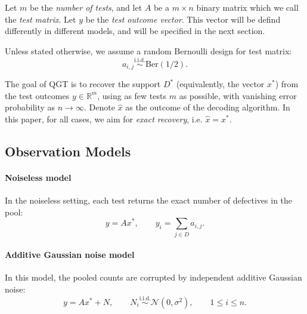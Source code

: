 \documentclass{article}
\newcommand{\Ber}{\mathrm{Ber}}
\newcommand{\supp}{\mathrm{supp}}
\begin{document}
Let $m$ be the \emph{number of tests}, and let $A$ be a $m\times n$ binary matrix which we call the \emph{test matrix}. 
Let $y$ be the \emph{test outcome vector}. This vector will be defind differently in different models, and will be specified in the next section. 

Unless stated otherwise, we assume a random Bernoulli design for test matrix:
\[
a_{i,j} \stackrel{\text{i.i.d.}}{\sim} \Ber(1/2).
\]

The goal of QGT is to recover the support $D^*$ (equivalently, the vector $x^*$) from the test outcomes $y\in\mathbb{R}^m$, using as few tests $m$ as possible, with vanishing error probability as $n\to\infty$. Denote $\widehat{x}$ as the outcome of the decoding algorithm. In this paper, for all cases, we aim for \emph{exact recovery}, i.e. $\widehat{x}=x^*$. 

\subsection{Observation Models}
\paragraph{Noiseless model}
In the noiseless setting, each test returns the exact number of defectives in the pool:
\begin{equation}
y = A x^*,
\qquad
y_i = \sum_{j\in D} a_{i,j}.
\label{eq:noiseless}
\end{equation}
\paragraph{Additive Gaussian noise model}
In this model, the pooled counts are corrupted by independent additive Gaussian noise:
\begin{equation}
y = A x^* + N,
\qquad
N_i \stackrel{\text{i.i.d.}}{\sim} \mathcal{N}(0,\sigma^2), \qquad 1\leq i\leq n.
\label{eq:gaussian}
\end{equation}
\end{document}

